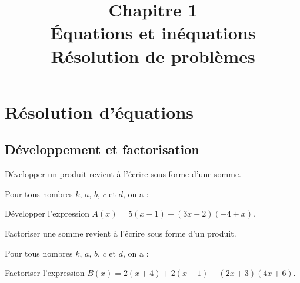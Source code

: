 \documentclass[xcolor={dvipsnames,svgnames,table}]{beamer}
\title[\'Equations et inéquations]{{\small Chapitre 1}\\[0.5cm] \textbf{\'Equations et inéquations}\\ \textbf{Résolution de problèmes}}
\date{}
\author{}
\begin{document}
\begin{frame}
\titlepage
\end{frame}


\section{Résolution d'équations}
\subsection{Développement et factorisation}

\begin{frame}
    \begin{definition}
        \alert{Développer} un produit revient à l'écrire sous forme d'une somme.
    \end{definition}

\pause

    \begin{Prop}
        Pour tous nombres $k$, $a$, $b$, $c$ et $d$, on a :
        \invisible{\[k(a + b) = ka + kb \qetq (a + b)(c + d) = ac + ad + bc+ bd.\]}
    \end{Prop}
\end{frame}

\begin{frame}
    \begin{Example}
        Développer l'expression $A(x) = 5(x - 1) - (3x - 2)(-4 + x)$.\par
        \rule{0pt}{6cm}
    \end{Example}
\end{frame}

\begin{frame}
    \begin{definition}
        \alert{Factoriser} une somme revient à l'écrire sous forme d'un produit.
    \end{definition}
\pause
    \begin{Prop}
        Pour tous nombres $k$, $a$, $b$, $c$ et $d$, on a :
        \invisible{\[ka + kb = k(a + b) \qetq a(c + d) + b(c + d) = (a + b)(c + d).\]}
    \end{Prop}
\end{frame}

\begin{frame}
    \begin{Example}
        Factoriser l'expression $B(x) = 2(x+4)+2(x-1) - (2x + 3)(4x + 6)$.\par\smallskip
        \rule{0pt}{5.5cm}
    \end{Example}
\end{frame}
\end{document}

